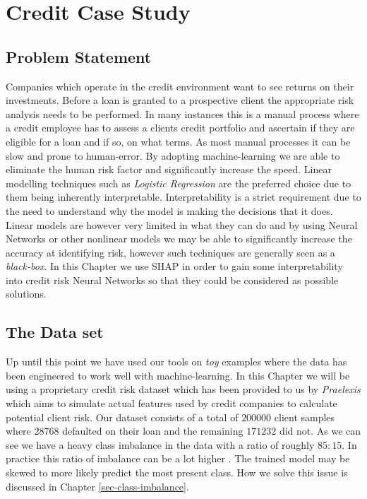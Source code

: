 
\chapter{Credit Case Study}

\section{Problem Statement}
Companies which operate in the credit environment want to see returns on their investments. Before a loan is granted to a prospective client the appropriate risk analysis needs to be performed. In many instances this is a manual process where a credit employee has to assess a clients credit portfolio and ascertain if they are eligible for a loan and if so, on what terms. As most manual processes it can be slow and prone to human-error. By adopting machine-learning we are able to eliminate the human risk factor and significantly increase the speed. Linear modelling techniques such as \emph{Logistic Regression} are the preferred choice due to them being inherently interpretable. Interpretability is a strict requirement due to the need to understand why the model is making the decisions that it does. Linear models are however very limited in what they can do and by using Neural Networks or other nonlinear models we may be able to significantly increase the accuracy at identifying risk, however such techniques are generally seen as a \emph{black-box}. In this Chapter we use SHAP in order to gain some interpretability into credit risk Neural Networks so that they could be considered as possible solutions.

\section{The Data set} Up until this point we have used our tools on \emph{toy} examples where the data has been engineered to work well with machine-learning. In this Chapter we will be using a proprietary credit risk dataset which has been provided to us by \emph{Praelexis} which aims to simulate actual features used by credit companies to calculate potential client risk. Our dataset consists of a total of $200000$ client samples where $28768$ defaulted on their loan and the remaining $171232$ did not. As we can see we have a heavy class imbalance in the data with a ratio of roughly $85:15$. In practice this ratio of imbalance can be a lot higher \cite{doi:10.1142/9789812813312_0009}. The trained model may be skewed to more likely predict the most present class. How we solve this issue is discussed in Chapter \ref{sec-class-imbalance}.

